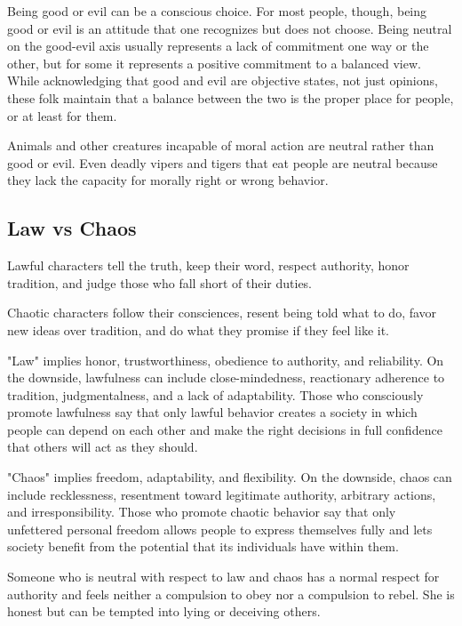 Being good or evil can be a conscious choice. For most people, though, being good 
or evil is an attitude that one recognizes but does not choose. Being neutral on 
the good-evil axis usually represents a lack of commitment one way or the other, 
but for some it represents a positive commitment to a balanced view. While acknowledging 
that good and evil are objective states, not just opinions, these folk maintain 
that a balance between the two is the proper place for people, or at least for 
them.

Animals and other creatures incapable of moral action are neutral rather than good 
or evil. Even deadly vipers and tigers that eat people are neutral because they 
lack the capacity for morally right or wrong behavior.

\subsection{Law vs Chaos}

Lawful characters tell the truth, keep their word, respect authority, honor tradition, 
and judge those who fall short of their duties. 

Chaotic characters follow their consciences, resent being told what to do, favor 
new ideas over tradition, and do what they promise if they feel like it.

"Law" implies honor, trustworthiness, obedience to authority, and reliability. 
On the downside, lawfulness can include close-mindedness, reactionary adherence 
to tradition, judgmentalness, and a lack of adaptability. Those who consciously 
promote lawfulness say that only lawful behavior creates a society in which people 
can depend on each other and make the right decisions in full confidence that others 
will act as they should.

"Chaos" implies freedom, adaptability, and flexibility. On the downside, chaos 
can include recklessness, resentment toward legitimate authority, arbitrary actions, 
and irresponsibility. Those who promote chaotic behavior say that only unfettered 
personal freedom allows people to express themselves fully and lets society benefit 
from the potential that its individuals have within them.

Someone who is neutral with respect to law and chaos has a normal respect for authority 
and feels neither a compulsion to obey nor a compulsion to rebel. She is honest 
but can be tempted into lying or deceiving others.


